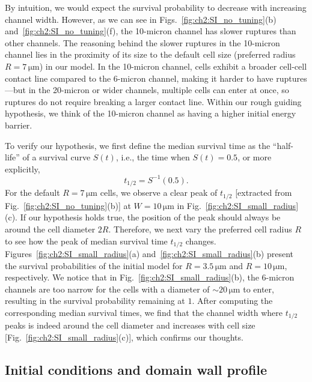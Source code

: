 By intuition, we would expect the survival probability to decrease with increasing channel width.
However, as we can see in Figs.~\ref{fig:ch2:SI_no_tuning}(b) and~\ref{fig:ch2:SI_no_tuning}(f), the 10-micron channel has slower ruptures than other channels.
The reasoning behind the slower ruptures in the 10-micron channel lies in the proximity of its size to the default cell size (preferred radius $R=7\,\mathrm{\mu m}$) in our model.
In the 10-micron channel, cells exhibit a broader cell-cell contact line compared to the 6-micron channel, making it harder to have ruptures---but in the 20-micron or wider channels, multiple cells can enter at once, so ruptures do not require breaking a larger contact line.
Within our rough guiding hypothesis, we think of the 10-micron channel as having a higher initial energy barrier.

To verify our hypothesis, we first define the median survival time as the ``half-life'' of a survival curve $S(t)$, i.e., the time when $S(t)=0.5$, or more explicitly,
\begin{equation}
    t_{1/2}=S^{-1}(0.5).
\end{equation}
For the default $R=7\,\mathrm{\mu m}$ cells, we observe a clear peak of $t_{1/2}$ [extracted from Fig.~\ref{fig:ch2:SI_no_tuning}(b)] at $W=10\,\mathrm{\mu m}$ in Fig.~\ref{fig:ch2:SI_small_radius}(c).
If our hypothesis holds true, the position of the peak should always be around the cell diameter $2R$.
Therefore, we next vary the preferred cell radius $R$ to see how the peak of median survival time $t_{1/2}$ changes.
Figures~\ref{fig:ch2:SI_small_radius}(a) and~\ref{fig:ch2:SI_small_radius}(b) present the survival probabilities of the initial model for $R=3.5\,\mathrm{\mu m}$ and $R=10\,\mathrm{\mu m}$, respectively.
We notice that in Fig.~\ref{fig:ch2:SI_small_radius}(b), the 6-micron channels are too narrow for the cells with a diameter of $\sim 20\,\mathrm{\mu m}$ to enter, resulting in the survival probability remaining at $1$.
After computing the corresponding median survival times, we find that the channel width where $t_{1/2}$ peaks is indeed around the cell diameter and increases with cell size [Fig.~\ref{fig:ch2:SI_small_radius}(c)], which confirms our thoughts.


\subsection{Initial conditions and domain wall profile}
\label{sec:ch2:init}

